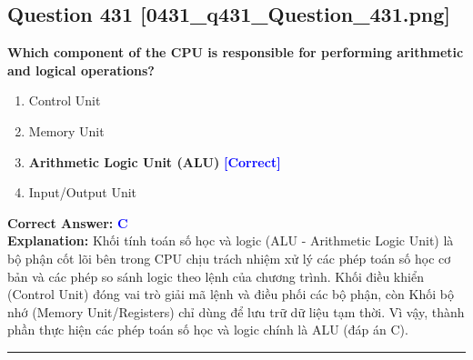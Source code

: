 \documentclass[11pt,a4paper]{article}
\begin{document}
\begin{minipage}{\textwidth}
\subsection*{Question 431 \quad \footnotesize{[0431\_q431\_Question\_431.png]}}
\noindent \textbf{Which component of the CPU is responsible for performing arithmetic and logical operations?}

\begin{enumerate}[label=\Alph*.]
    \item Control Unit
    \item Memory Unit
    \item \textbf{Arithmetic Logic Unit (ALU)} \hfill \textcolor{blue}{\textbf{[Correct]}}
    \item Input/Output Unit
\end{enumerate}

\noindent \textbf{Correct Answer:} \textcolor{blue}{\textbf{C}} \\[2pt]
\noindent \textbf{Explanation:} Khối tính toán số học và logic (ALU - Arithmetic Logic Unit) là bộ phận cốt lõi bên trong CPU chịu trách nhiệm xử lý các phép toán số học cơ bản và các phép so sánh logic theo lệnh của chương trình. Khối điều khiển (Control Unit) đóng vai trò giải mã lệnh và điều phối các bộ phận, còn Khối bộ nhớ (Memory Unit/Registers) chỉ dùng để lưu trữ dữ liệu tạm thời. Vì vậy, thành phần thực hiện các phép toán số học và logic chính là ALU (đáp án C).

\par\vspace{0.3cm}
\hrule
\vspace{0.3cm}
\end{minipage}
\end{document}
